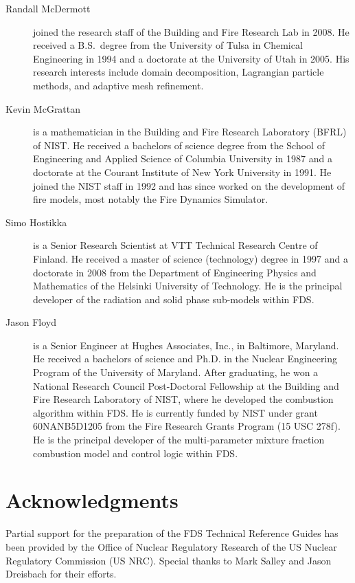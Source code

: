 \documentclass[11pt]{book}
\begin{document}
\begin{description}
\item[Randall McDermott] joined the research staff of the Building and Fire Research Lab in 2008. He received a B.S.~degree from the University of Tulsa in
Chemical Engineering in 1994 and a doctorate at the University of Utah in 2005. His research interests include domain decomposition, Lagrangian particle methods, and
adaptive mesh refinement.
\item[Kevin McGrattan] is a mathematician in the Building and Fire Research Laboratory (BFRL) of NIST. He received a bachelors of science degree from
the School of Engineering and Applied Science of Columbia University in 1987 and a doctorate at the Courant Institute
of New York University in 1991. He joined the NIST staff in 1992 and has since worked on the development of fire models, most notably the
Fire Dynamics Simulator.
\item[Simo Hostikka] is a Senior Research Scientist at VTT Technical
Research Centre of Finland. He received a master of science
(technology) degree in 1997 and a doctorate in 2008 from
the Department of Engineering Physics and Mathematics of the
Helsinki University of Technology.  He is the principal developer of the
radiation and solid phase sub-models within FDS.
\item[Jason Floyd] is a Senior Engineer at Hughes Associates, Inc., in Baltimore, Maryland. He received a bachelors of science and Ph.D. in the Nuclear Engineering
Program of the University of Maryland. After graduating, he won a National Research Council Post-Doctoral Fellowship at the Building and Fire
Research Laboratory of NIST, where he developed the combustion algorithm within FDS.
He is currently funded by NIST under grant 60NANB5D1205 from the Fire Research Grants Program (15 USC 278f).
He is the principal developer of the multi-parameter mixture fraction combustion model and control logic within FDS.
\end{description}



\chapter{Acknowledgments}

\label{acksection}

Partial support for the preparation of the FDS Technical Reference Guides
has been provided by the Office of Nuclear Regulatory Research
of the US Nuclear Regulatory Commission (US NRC). Special thanks to
Mark Salley and Jason Dreisbach for their efforts.
\end{document}
